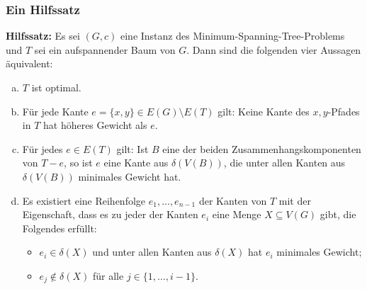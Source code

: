 \documentclass[smaller]{beamer}
\begin{document}
\begin{frame}
\frametitle{Ein Hilfssatz}
 \textbf{Hilfssatz:} Es sei $(G,c)$ eine Instanz des Minimum-Spanning-Tree-Problems und $T$ sei ein aufspannender Baum von $G$. \alert{Dann sind die folgenden vier Aussagen äquivalent:}
	\begin{enumerate}[a)]
		\item $T$ ist optimal.
		
		\item Für jede Kante $e = \big\{ x,y \big\} \in E(G) \setminus E(T)$ gilt: Keine Kante des $x,y$-Pfades in $T$ hat höheres Gewicht als $e$.
		
		\item Für jedes $e \in E(T)$ gilt: Ist $B$ eine der beiden Zusammenhangskomponenten von $T-e$, so ist $e$ eine Kante aus $\delta(V(B))$, die unter allen Kanten aus $\delta(V(B))$ minimales Gewicht hat.
		
		\item Es existiert eine Reihenfolge $e_1,\ldots,e_{n-1}$ der Kanten von $T$ mit der Eigenschaft, dass es zu jeder der Kanten $e_i$ eine Menge $X \subseteq V(G)$ gibt, die Folgendes erfüllt:
		\begin{itemize}
			\item $e_i \in \delta(X)$ und unter allen Kanten aus $\delta(X)$ hat $e_i$ minimales Gewicht;
			
			\item $e_j \notin \delta(X)$ für alle $j \in \big\{ 1,\ldots, i-1\big\}$. 
		\end{itemize}
	\end{enumerate}
\end{frame}
\end{document}

